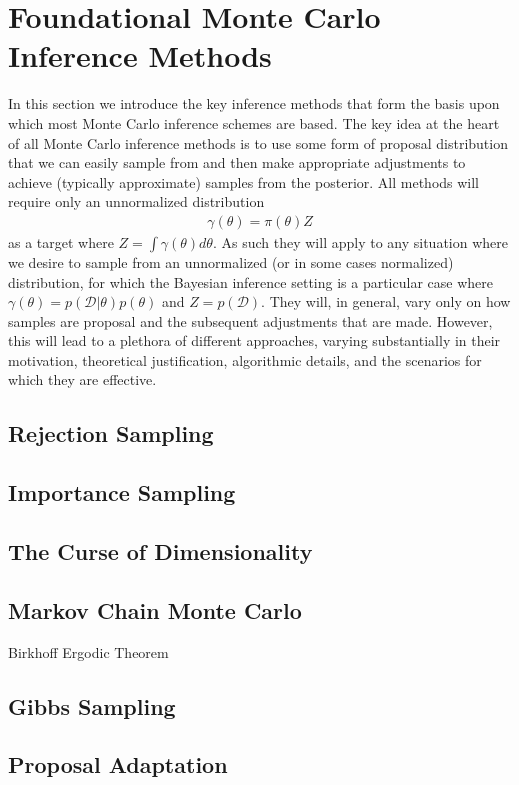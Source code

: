 
\section{Foundational Monte Carlo Inference Methods}
\label{sec:inf:foundation}

In this section we introduce the key inference methods that form
the basis upon which most Monte Carlo inference schemes are based.  The
key idea at the heart of all Monte Carlo inference methods is to use some form
of proposal distribution that we can easily sample from and then make
appropriate adjustments to achieve (typically approximate) samples from
the posterior.  All methods will require only an unnormalized distribution
\begin{align}
\label{eq:inf:unnorm-target}
\gamma(\theta) = \pi(\theta)Z
\end{align}
as a target where $Z = \int \gamma(\theta) d\theta$.  As such they will apply to
any situation where we desire to sample from an unnormalized 
(or in some cases normalized) distribution, for which
the Bayesian inference setting is a particular case where
$\gamma(\theta) = p(\mathcal{D}|\theta)p(\theta)$ and $Z = p(\mathcal{D})$.
They will, in general, vary only on how samples are proposal
and the subsequent adjustments that are made.  However, this will lead to a
plethora of different approaches, varying substantially in their motivation,
theoretical justification, algorithmic details, and the scenarios for which they
are effective.

\subsection{Rejection Sampling}
\label{sec:inf:foundation:rejection}



\subsection{Importance Sampling}
\label{sec:inf:foundation:importance}



\subsection{The Curse of Dimensionality}
\label{sec:inf:foundation:curse}


\subsection{Markov Chain Monte Carlo}
\label{sec:inf:foundation:mcmc}

Birkhoff Ergodic Theorem

\subsection{Gibbs Sampling}
\label{sec:inf:foundation:gibbs}

\subsection{Proposal Adaptation}
\label{sec:inf:proposal-adapt}